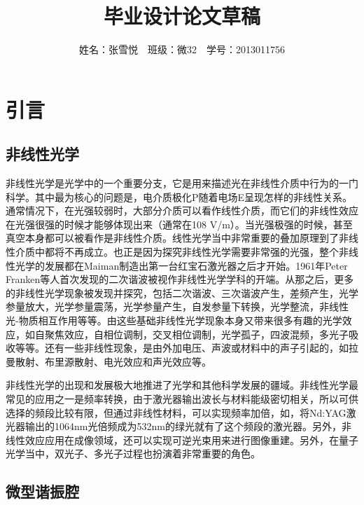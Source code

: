 \documentclass[UTF8,a4paper,cs4size,hyperref]{ctexart}
\title{毕业设计论文草稿}
\author{姓名：张雪悦\ \ 班级：微32\ \ 学号：2013011756}
\begin{document}
\maketitle
\section{引言}

\subsection{非线性光学}

非线性光学是光学中的一个重要分支，它是用来描述光在非线性介质中行为的一门科学。其中最为核心的问题是，电介质极化P随着电场E呈现怎样的非线性关系。通常情况下，在光强较弱时，大部分介质可以看作线性介质，而它们的非线性效应在光强很强的时候才能够体现出来（通常在108 V/m）。当光强极强的时候，甚至真空本身都可以被看作是非线性介质。线性光学当中非常重要的叠加原理到了非线性介质中都将不再成立。也正是因为探究非线性光学需要非常强的光强，整个非线性光学的发展都在Maiman制造出第一台红宝石激光器之后才开始\cite{maiman1960stimulated}。1961年Peter Franken等人首次发现的二次谐波被视作非线性光学学科的开端\cite{franken1961generation}。从那之后，更多的非线性光学现象被发现并探究，包括二次谐波、三次谐波产生，差频产生，光学参量放大，光学参量震荡，光学参量产生，自发参量下转换，光学整流，非线性光-物质相互作用等等。由这些基础非线性光学现象本身又带来很多有趣的光学效应，如自聚焦效应，自相位调制，交叉相位调制，光学孤子，四波混频，多光子吸收等等。还有一些非线性现象，是由外加电压、声波或材料中的声子引起的，如拉曼散射、布里源散射、电光效应和声光效应等\cite{boyd2003nonlinear}。

非线性光学的出现和发展极大地推进了光学和其他科学发展的疆域。非线性光学最常见的应用之一是频率转换，由于激光器输出波长与材料能级密切相关，所以可供选择的频段比较有限，但通过非线性材料，可以实现频率加倍，如，将Nd:YAG激光器输出的1064nm光倍频成为532nm的绿光就有了这个频段的激光器。另外，非线性效应应用在成像领域，还可以实现可逆光束用来进行图像重建。另外，在量子光学当中，双光子、多光子过程也扮演着非常重要的角色\cite{scully1999quantum}。

\subsection{微型谐振腔}
\end{document}
